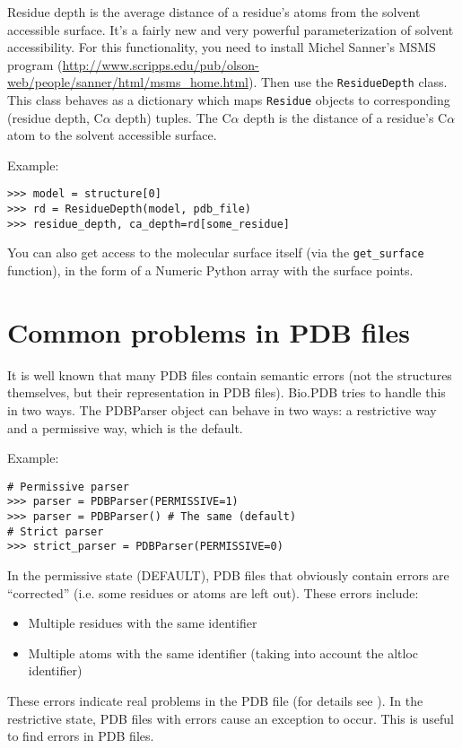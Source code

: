 Residue depth is the average distance of a residue's atoms from the
solvent accessible surface. It's a fairly new and very powerful parameterization
of solvent accessibility. For this functionality, you need to install
Michel Sanner's MSMS program (\url{http://www.scripps.edu/pub/olson-web/people/sanner/html/msms_home.html}).
Then use the \texttt{ResidueDepth} class. This class behaves as a
dictionary which maps \texttt{Residue} objects to corresponding (residue
depth, C$\alpha$ depth) tuples. The C$\alpha$ depth is the distance
of a residue's C$\alpha$ atom to the solvent accessible surface.

Example:

\begin{verbatim}
>>> model = structure[0]
>>> rd = ResidueDepth(model, pdb_file)
>>> residue_depth, ca_depth=rd[some_residue]
\end{verbatim}
You can also get access to the molecular surface itself (via the \texttt{get\_surface}
function), in the form of a Numeric Python array with the surface points.

\section{Common problems in PDB files}

It is well known that many PDB files contain semantic errors (not the
structures themselves, but their representation in PDB files).
Bio.PDB tries to handle this in two ways. The PDBParser
object can behave in two ways: a restrictive way and a permissive
way, which is the default.

Example:

\begin{verbatim}
# Permissive parser
>>> parser = PDBParser(PERMISSIVE=1)
>>> parser = PDBParser() # The same (default)
# Strict parser
>>> strict_parser = PDBParser(PERMISSIVE=0)
\end{verbatim}
In the permissive state (DEFAULT), PDB files that obviously contain
errors are ``corrected'' (i.e. some residues or atoms are left out).
These errors include:

\begin{itemize}
\item Multiple residues with the same identifier
\item Multiple atoms with the same identifier (taking into account the altloc
identifier)
\end{itemize}
These errors indicate real problems in the PDB file (for details see
\cite[Hamelryck and Manderick, 2003]{hamelryck2003a}). In the restrictive state, PDB files with errors cause an exception to occur. This is useful to find errors in PDB files.

